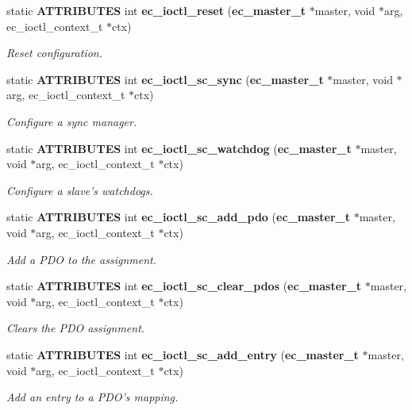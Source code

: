 \begin{DoxyCompactItemize}
static {\bf \-A\-T\-T\-R\-I\-B\-U\-T\-E\-S} int {\bf ec\-\_\-ioctl\-\_\-reset} ({\bf ec\-\_\-master\-\_\-t} $\ast$master, void $\ast$arg, ec\-\_\-ioctl\-\_\-context\-\_\-t $\ast$ctx)
\begin{DoxyCompactList}\small\item\em \-Reset configuration. \end{DoxyCompactList}\item 
static {\bf \-A\-T\-T\-R\-I\-B\-U\-T\-E\-S} int {\bf ec\-\_\-ioctl\-\_\-sc\-\_\-sync} ({\bf ec\-\_\-master\-\_\-t} $\ast$master, void $\ast$arg, ec\-\_\-ioctl\-\_\-context\-\_\-t $\ast$ctx)
\begin{DoxyCompactList}\small\item\em \-Configure a sync manager. \end{DoxyCompactList}\item 
static {\bf \-A\-T\-T\-R\-I\-B\-U\-T\-E\-S} int {\bf ec\-\_\-ioctl\-\_\-sc\-\_\-watchdog} ({\bf ec\-\_\-master\-\_\-t} $\ast$master, void $\ast$arg, ec\-\_\-ioctl\-\_\-context\-\_\-t $\ast$ctx)
\begin{DoxyCompactList}\small\item\em \-Configure a slave's watchdogs. \end{DoxyCompactList}\item 
static {\bf \-A\-T\-T\-R\-I\-B\-U\-T\-E\-S} int {\bf ec\-\_\-ioctl\-\_\-sc\-\_\-add\-\_\-pdo} ({\bf ec\-\_\-master\-\_\-t} $\ast$master, void $\ast$arg, ec\-\_\-ioctl\-\_\-context\-\_\-t $\ast$ctx)
\begin{DoxyCompactList}\small\item\em \-Add a \-P\-D\-O to the assignment. \end{DoxyCompactList}\item 
static {\bf \-A\-T\-T\-R\-I\-B\-U\-T\-E\-S} int {\bf ec\-\_\-ioctl\-\_\-sc\-\_\-clear\-\_\-pdos} ({\bf ec\-\_\-master\-\_\-t} $\ast$master, void $\ast$arg, ec\-\_\-ioctl\-\_\-context\-\_\-t $\ast$ctx)
\begin{DoxyCompactList}\small\item\em \-Clears the \-P\-D\-O assignment. \end{DoxyCompactList}\item 
static {\bf \-A\-T\-T\-R\-I\-B\-U\-T\-E\-S} int {\bf ec\-\_\-ioctl\-\_\-sc\-\_\-add\-\_\-entry} ({\bf ec\-\_\-master\-\_\-t} $\ast$master, void $\ast$arg, ec\-\_\-ioctl\-\_\-context\-\_\-t $\ast$ctx)
\begin{DoxyCompactList}\small\item\em \-Add an entry to a \-P\-D\-O's mapping. \end{DoxyCompactList}\item 

\end{DoxyCompactItemize}
